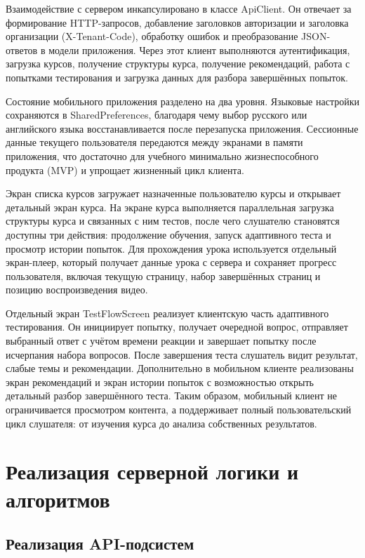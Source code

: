 Взаимодействие с сервером инкапсулировано в классе ApiClient. Он отвечает за формирование HTTP-запросов, добавление заголовков авторизации и заголовка организации (X-Tenant-Code), обработку ошибок и преобразование JSON-ответов в модели приложения. Через этот клиент выполняются аутентификация, загрузка курсов, получение структуры курса, получение рекомендаций, работа с попытками тестирования и загрузка данных для разбора завершённых попыток.

Состояние мобильного приложения разделено на два уровня. Языковые настройки сохраняются в SharedPreferences, благодаря чему выбор русского или английского языка восстанавливается после перезапуска приложения. Сессионные данные текущего пользователя передаются между экранами в памяти приложения, что достаточно для учебного минимально жизнеспособного продукта (MVP) и упрощает жизненный цикл клиента.

Экран списка курсов загружает назначенные пользователю курсы и открывает детальный экран курса. На экране курса выполняется параллельная загрузка структуры курса и связанных с ним тестов, после чего слушателю становятся доступны три действия: продолжение обучения, запуск адаптивного теста и просмотр истории попыток. Для прохождения урока используется отдельный экран-плеер, который получает данные урока с сервера и сохраняет прогресс пользователя, включая текущую страницу, набор завершённых страниц и позицию воспроизведения видео.

Отдельный экран TestFlowScreen реализует клиентскую часть адаптивного тестирования. Он инициирует попытку, получает очередной вопрос, отправляет выбранный ответ с учётом времени реакции и завершает попытку после исчерпания набора вопросов. После завершения теста слушатель видит результат, слабые темы и рекомендации. Дополнительно в мобильном клиенте реализованы экран рекомендаций и экран истории попыток с возможностью открыть детальный разбор завершённого теста. Таким образом, мобильный клиент не ограничивается просмотром контента, а поддерживает полный пользовательский цикл слушателя: от изучения курса до анализа собственных результатов.

\section{Реализация серверной логики и алгоритмов}

\subsection{Реализация API-подсистем}

